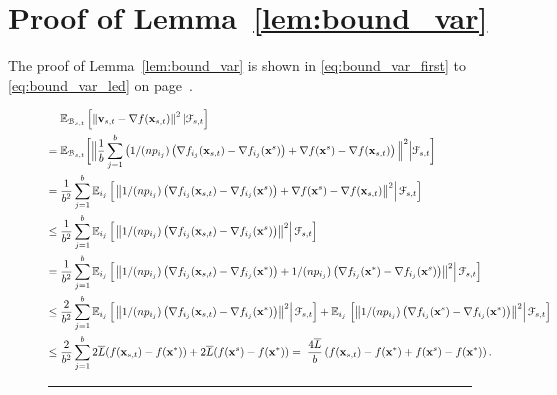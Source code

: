 \documentclass[10pt,twocolumn,journal]{IEEEtran}
\begin{document}
\setcounter{lemma}{0}
\setcounter{theorem}{0}
\setcounter{section}{0}
\setcounter{remark}{0}


\appendices

\section{Proof of Lemma~\ref{lem:bound_var}}\label{sec:proof_bound_var}

The proof of Lemma~\ref{lem:bound_var} is shown in \eqref{eq:bound_var_first} to \eqref{eq:bound_var_led} on page~\pageref{fig:equations}. 
\begin{figure*}[h!] \label{fig:equations}
\begin{align}
&\bbE_{\calB_{s,t}}\left[\norm{\bv_{s,t}-\nabla f(\bx_{s,t})}^2\vert\calF_{s,t}\right]\label{eq:bound_var_first}\\
=\;& \bbE_{\calB_{s,t}}\bigg[\Big\Vert\frac{1}{b}\sum_{j=1}^b\left(1/(np_{i_j})\left(\nabla f_{i_j}(\bx_{s,t})-\nabla f_{i_j}(\bx^s)\right)+\nabla f(\bx^s)-\nabla f(\bx_{s,t})\right)\Big\Vert^2\Big\vert\calF_{s,t}\bigg]\\
=\;&\frac{1}{b^2} \sum_{j=1}^b\bbE_{i_j}\left[\left.\norm{1/(np_{i_j})\left(\nabla f_{i_j}(\bx_{s,t})-\nabla f_{i_j}(\bx^s)\right)+\nabla f(\bx^s)-\nabla f(\bx_{s,t})}^2\right\vert\calF_{s,t}\right]\label{eq:bound_var_eqa}\\
\le\;&\frac{1}{b^2} \sum_{j=1}^b\bbE_{i_j}\left[\left.\norm{1/(np_{i_j})\left(\nabla f_{i_j}(\bx_{s,t})-\nabla f_{i_j}(\bx^s)\right)}^2\right\vert\calF_{s,t}\right]\label{eq:bound_var_leb}\\
=\;&\frac{1}{b^2} \sum_{j=1}^b\bbE_{i_j}\left[\left.\norm{1/(np_{i_j})\left(\nabla f_{i_j}(\bx_{s,t})-\nabla f_{i_j}(\bx^*)\right)+1/(np_{i_j})\left(\nabla f_{i_j}(\bx^*)-\nabla f_{i_j}(\bx^s)\right)}^2\right\vert\calF_{s,t}\right]\\
\le\;&\frac{2}{b^2} \sum_{j=1}^b\bbE_{i_j}\left[\left.\norm{1/(np_{i_j})\left(\nabla f_{i_j}(\bx_{s,t})-\nabla f_{i_j}(\bx^*)\right)}^2\right\vert\calF_{s,t}\right]+\bbE_{i_j}\left.\left[\norm{1/(np_{i_j})\left(\nabla f_{i_j}(\bx^s)-\nabla f_{i_j}(\bx^*)\right)}^2\right\vert\calF_{s,t}\right]\label{eq:bound_var_lec}\\
\le\;&\frac{2}{b^2} \sum_{j=1}^b 2\barL(f(\bx_{s,t})-f(\bx^*))+2\barL(f(\bx^{s})-f(\bx^*))
=\; \frac{4\barL}{b} \left(f(\bx_{s,t})-f(\bx^*)+f(\bx^s)-f(\bx^*)\right).\label{eq:bound_var_led}%
\end{align}\hrule
\end{figure*}
\end{document}
